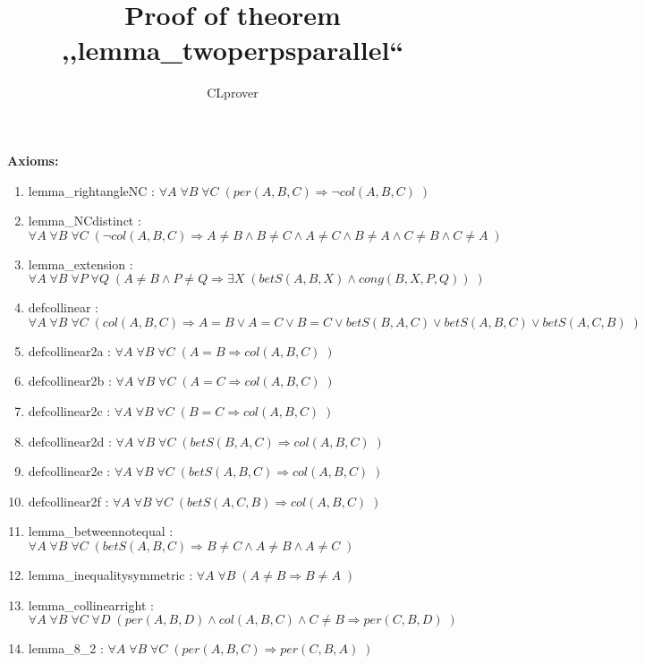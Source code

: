 \documentclass{article}
\begin{document}
\title{Proof of theorem ,,lemma\_twoperpsparallel``}
\author{CLprover}
\maketitle

\noindent 
{\bfseries Axioms:} 
\begin{enumerate}
\item lemma\_rightangleNC : $\forall A \; \forall B \; \forall C \; ( per(A, B, C) \Rightarrow \neg col(A, B, C)\;)$
\item lemma\_NCdistinct : $\forall A \; \forall B \; \forall C \; ( \neg col(A, B, C) \Rightarrow A \neq B\wedge B \neq C\wedge A \neq C\wedge B \neq A\wedge C \neq B\wedge C \neq A\;)$
\item lemma\_extension : $\forall A \; \forall B \; \forall P \; \forall Q \; ( A \neq B\wedge P \neq Q \Rightarrow \exists X \; (betS(A, B, X)\wedge cong(B, X, P, Q))\;)$
\item defcollinear : $\forall A \; \forall B \; \forall C \; ( col(A, B, C) \Rightarrow A = B\vee A = C\vee B = C\vee betS(B, A, C)\vee betS(A, B, C)\vee betS(A, C, B)\;)$
\item defcollinear2a : $\forall A \; \forall B \; \forall C \; ( A = B \Rightarrow col(A, B, C)\;)$
\item defcollinear2b : $\forall A \; \forall B \; \forall C \; ( A = C \Rightarrow col(A, B, C)\;)$
\item defcollinear2c : $\forall A \; \forall B \; \forall C \; ( B = C \Rightarrow col(A, B, C)\;)$
\item defcollinear2d : $\forall A \; \forall B \; \forall C \; ( betS(B, A, C) \Rightarrow col(A, B, C)\;)$
\item defcollinear2e : $\forall A \; \forall B \; \forall C \; ( betS(A, B, C) \Rightarrow col(A, B, C)\;)$
\item defcollinear2f : $\forall A \; \forall B \; \forall C \; ( betS(A, C, B) \Rightarrow col(A, B, C)\;)$
\item lemma\_betweennotequal : $\forall A \; \forall B \; \forall C \; ( betS(A, B, C) \Rightarrow B \neq C\wedge A \neq B\wedge A \neq C\;)$
\item lemma\_inequalitysymmetric : $\forall A \; \forall B \; ( A \neq B \Rightarrow B \neq A\;)$
\item lemma\_collinearright : $\forall A \; \forall B \; \forall C \; \forall D \; ( per(A, B, D)\wedge col(A, B, C)\wedge C \neq B \Rightarrow per(C, B, D)\;)$
\item lemma\_8\_2 : $\forall A \; \forall B \; \forall C \; ( per(A, B, C) \Rightarrow per(C, B, A)\;)$

\end{enumerate}
\end{document}
